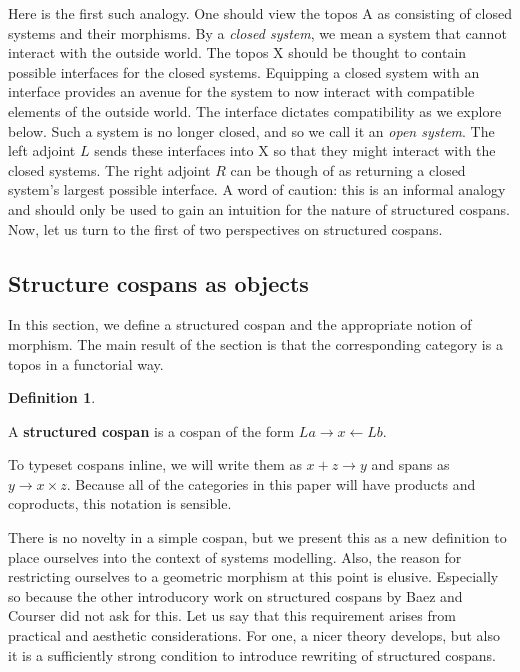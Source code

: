 \documentclass{amsart}
\newcommand{\A}{\cat{A}}
\newcommand{\X}{\cat{X}}
\newcommand{\defn}[1]{\textbf{#1}}
\newcommand{\cat}[1]{\mathrm{#1}}
\newcommand{\spn}[3]{#2 \to #1 \times #3}
\newcommand{\csp}[3]{#1 + #3 \to #2}
\theoremstyle{remark}
\theoremstyle{definition}
\newtheorem{definition}[theorem]{Definition}
\begin{document}
Here is the first such analogy. One should view the topos $ \A $ as
consisting of closed systems and their morphisms. By a \emph{closed
  system}, we mean a system that cannot interact with the outside
world. The topos $ \X $ should be thought to contain possible
interfaces for the closed systems. Equipping a closed system with an
interface provides an avenue for the system to now interact with
compatible elements of the outside world. The interface dictates
compatibility as we explore below.  Such a system is no longer closed,
and so we call it an \emph{open system}. The left adjoint $ L $ sends
these interfaces into $ \X $ so that they might interact with the
closed systems. The right adjoint $ R $ can be though of as returning
a closed system's largest possible interface. A word of caution: this
is an informal analogy and should only be used to gain an intuition
for the nature of structured cospans. Now, let us turn to the first of
two perspectives on structured cospans.


\subsection{Structure cospans as objects}
\label{sec:strcsp-as-object}


In this section, we define a structured cospan and the appropriate
notion of morphism. The main result of the section is that the
corresponding category is a topos in a functorial way.

\begin{definition}\label{df:strcsp}

  A \defn{ structured cospan } is a cospan of the form
  $ La \to x \gets Lb $.
  
\end{definition}

To typeset cospans inline, we will write them as $
\csp{x}{y}{z} $ and spans as $ \spn{x}{y}{z} $. Because all of the
categories in this paper will have products and coproducts, this
notation is sensible.  

There is no novelty in a simple cospan, but we present this as a new
definition to place ourselves into the context of systems
modelling. Also, the reason for restricting ourselves to a geometric
morphism at this point is elusive. Especially so because the other
introducory work on structured cospans by Baez and Courser did not ask
for this. Let us say that this requirement arises from practical and
aesthetic considerations. For one, a nicer theory develops, but also
it is a sufficiently strong condition to introduce rewriting of
structured cospans.
\end{document}
